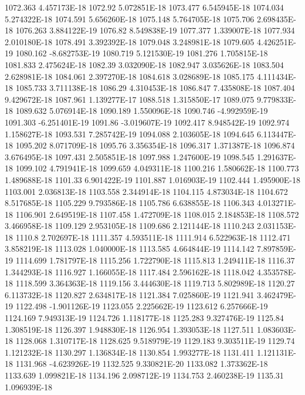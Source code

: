 1072.363  4.457173E-18
1072.92  5.072851E-18
1073.477  6.545945E-18
1074.034  5.274322E-18
1074.591  5.656260E-18
1075.148  5.764705E-18
1075.706  2.698435E-18
1076.263  3.884122E-19
1076.82  8.549838E-19
1077.377  1.339007E-18
1077.934  2.010180E-18
1078.491  3.392392E-18
1079.048  3.248981E-18
1079.605  4.426251E-19
1080.162  -8.682753E-19
1080.719  5.121530E-19
1081.276  1.705815E-18
1081.833  2.475624E-18
1082.39  3.032090E-18
1082.947  3.035626E-18
1083.504  2.628981E-18
1084.061  2.397270E-18
1084.618  3.028689E-18
1085.175  4.111434E-18
1085.733  3.711138E-18
1086.29  4.310453E-18
1086.847  7.435808E-18
1087.404  9.429672E-18
1087.961  1.139277E-17
1088.518  1.315850E-17
1089.075  9.779833E-18
1089.632  5.076914E-18
1090.189  1.550096E-18
1090.746  -4.992959E-19
1091.303  -6.251401E-19
1091.86  -3.019607E-19
1092.417  8.948542E-19
1092.974  1.158627E-18
1093.531  7.285742E-19
1094.088  2.103605E-18
1094.645  6.113447E-18
1095.202  8.071709E-18
1095.76  3.356354E-18
1096.317  1.371387E-18
1096.874  3.676495E-18
1097.431  2.505851E-18
1097.988  1.247600E-19
1098.545  1.291637E-18
1099.102  4.791941E-18
1099.659  4.049311E-18
1100.216  1.580662E-18
1100.773  1.489688E-18
1101.33  6.901422E-19
1101.887  1.016903E-19
1102.444  1.495900E-18
1103.001  2.036813E-18
1103.558  2.344914E-18
1104.115  4.873034E-18
1104.672  8.517685E-18
1105.229  9.793586E-18
1105.786  6.638855E-18
1106.343  4.013271E-18
1106.901  2.649519E-18
1107.458  1.472709E-18
1108.015  2.184853E-18
1108.572  3.466958E-18
1109.129  2.953105E-18
1109.686  2.121144E-18
1110.243  2.031153E-18
1110.8  2.702697E-18
1111.357  4.593511E-18
1111.914  6.522963E-18
1112.471  3.858219E-18
1113.028  1.040000E-18
1113.585  4.664844E-19
1114.142  7.897859E-19
1114.699  1.781797E-18
1115.256  1.722790E-18
1115.813  1.249411E-18
1116.37  1.344293E-18
1116.927  1.166055E-18
1117.484  2.596162E-18
1118.042  4.353578E-18
1118.599  3.364363E-18
1119.156  3.444630E-18
1119.713  5.802989E-18
1120.27  6.113732E-18
1120.827  2.634817E-18
1121.384  7.025860E-19
1121.941  3.462479E-19
1122.498  -1.901126E-19
1123.055  2.225662E-19
1123.612  6.257666E-19
1124.169  7.949313E-19
1124.726  1.118177E-18
1125.283  9.327476E-19
1125.84  1.308519E-18
1126.397  1.948830E-18
1126.954  1.393053E-18
1127.511  1.083603E-18
1128.068  1.310717E-18
1128.625  9.518979E-19
1129.183  9.303511E-19
1129.74  1.121232E-18
1130.297  1.136834E-18
1130.854  1.993277E-18
1131.411  1.121131E-18
1131.968  -4.623926E-19
1132.525  9.330821E-20
1133.082  1.373362E-18
1133.639  1.099821E-18
1134.196  2.098712E-19
1134.753  2.460238E-19
1135.31  1.096939E-18
